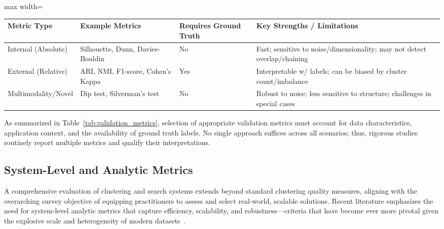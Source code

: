 \documentclass[sigconf]{acmart}
\begin{document}
\begin{table*}[htbp]
\centering
\caption{Common Cluster Validation Metrics: Key Properties and Use Cases}
\label{tab:validation_metrics}
\begin{adjustbox}{max width=\textwidth}
\begin{tabular}{llll}
\toprule
\textbf{Metric Type} & \textbf{Example Metrics} & \textbf{Requires Ground Truth} & \textbf{Key Strengths / Limitations} \\
\midrule
Internal (Absolute)  & Silhouette, Dunn, Davies-Bouldin & No  & Fast; sensitive to noise/dimensionality; may not detect overlap/chaining \\
External (Relative)  & ARI, NMI, F1-score, Cohen's Kappa & Yes & Interpretable w/ labels; can be biased by cluster count/imbalance        \\
Multimodality/Novel  & Dip test, Silverman's test         & No  & Robust to noise; less sensitive to structure; challenges in special cases \\
\bottomrule
\end{tabular}
\end{adjustbox}
\end{table*}

As summarized in Table~\ref{tab:validation_metrics}, selection of appropriate validation metrics must account for data characteristics, application context, and the availability of ground truth labels. No single approach suffices across all scenarios; thus, rigorous studies routinely report multiple metrics and qualify their interpretations.

\subsection{System-Level and Analytic Metrics}

A comprehensive evaluation of clustering and search systems extends beyond standard clustering quality measures, aligning with the overarching survey objective of equipping practitioners to assess and select real-world, scalable solutions. Recent literature emphasizes the need for system-level analytic metrics that capture efficiency, scalability, and robustness—criteria that have become ever more pivotal given the explosive scale and heterogeneity of modern datasets~\cite{ref59, ref60, ref64, ref65, ref66, ref67, ref74, ref77, ref78, ref79, ref80, ref81, ref86, ref87, ref106, ref108, ref109, ref110, ref116, ref117, ref118}.
\end{document}
